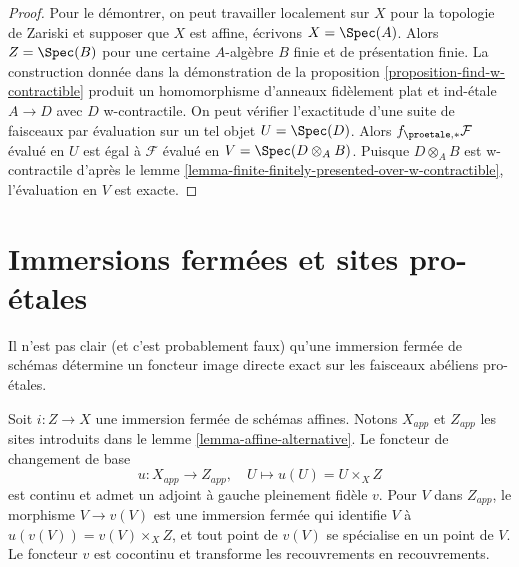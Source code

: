 \begin{proof}
Pour le démontrer, on peut travailler localement sur $X$ pour la topologie de Zariski et supposer que $X$
est affine, écrivons $X = \Spec(A)$. Alors $Z = \Spec(B)$ pour une certaine
$A$-algèbre $B$ finie et de présentation finie. La construction donnée dans la démonstration de la
proposition \ref{proposition-find-w-contractible}
produit un homomorphisme d'anneaux fidèlement plat et ind-\'etale $A \to D$
avec $D$ w-contractile. On peut vérifier l'exactitude d'une suite de
faisceaux par évaluation sur un tel objet $U = \Spec(D)$. Alors
$f_{\proetale, *}\mathcal{F}$
évalué en $U$ est égal à $\mathcal{F}$ évalué en
$V = \Spec(D \otimes_A B)$. Puisque $D \otimes_A B$ est w-contractile
d'après le lemme \ref{lemma-finite-finitely-presented-over-w-contractible},
l'évaluation en $V$ est exacte.
\end{proof}








\section{Immersions fermées et sites pro-\'etales}
\label{section-closed-immersion}

\noindent
Il n'est pas clair (et c'est probablement faux) qu'une immersion fermée de schémas
détermine un foncteur image directe exact sur les faisceaux abéliens pro-\'etales.

\begin{lemma}
\label{lemma-closed-immersion-affines}
Soit $i : Z \to X$ une immersion fermée de schémas affines.
Notons $X_{app}$ et $Z_{app}$ les sites introduits dans le
lemme \ref{lemma-affine-alternative}.
Le foncteur de changement de base
$$
u : X_{app} \to Z_{app},\quad U \longmapsto u(U) = U \times_X Z
$$
est continu et admet un adjoint à gauche pleinement fidèle $v$.
Pour $V$ dans $Z_{app}$, le morphisme $V \to v(V)$ est une immersion fermée
qui identifie $V$ à $u(v(V)) = v(V) \times_X Z$, et tout point de
$v(V)$ se spécialise en un point de $V$.
Le foncteur $v$ est cocontinu et transforme les recouvrements en recouvrements.
\end{lemma}

